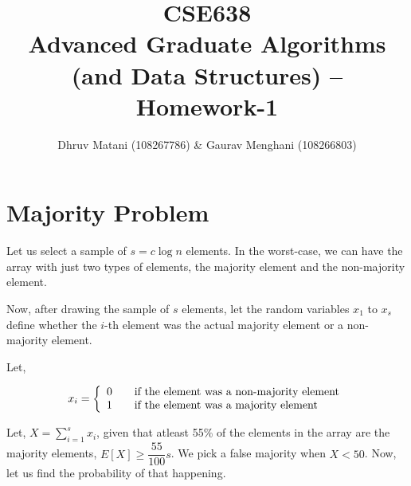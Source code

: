 \documentclass{article}
\title{CSE638 \\ Advanced Graduate Algorithms (and Data Structures) -- Homework-1}
\author{Dhruv Matani (108267786) \& Gaurav Menghani (108266803)}
\begin{document}
\maketitle

\clearpage

\tableofcontents

\clearpage

\section{Majority Problem}
Let us select a sample of $s = c\log{n}$ elements. In the worst-case, we can
have the array with just two types of elements, the majority element and the
non-majority element.

Now, after drawing the sample of $s$ elements, let the random variables
$x_{1}$ to $x_{s}$ define whether the $i$-th element was the actual majority
element or a non-majority element.

Let,

\[
  x_{i} = \left\{
  \begin{array}{l l}
    0 & \quad \text{if the element was a non-majority element}\\
    1 & \quad \text{if the element was a majority element}\\
  \end{array}
  \right.
\]

Let, $X = \displaystyle\sum\limits_{i=1}^s{x_{i}}$,
given that atleast 55\% of the elements in the array are the majority elements,
$E[X] \geq \dfrac{55}{100}s$. We pick a false majority when $X < 50$. Now,
let us find the probability of that happening.
\end{document}
